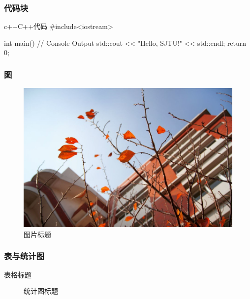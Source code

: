 \documentclass[
]{beamer}
\begin{document}
    \begin{frame}[fragile]          %
        \frametitle{代码块}
        \begin{codeblock}{c++}{C++代码}
#include<iostream>

int main(){
    // Console Output
    std::cout << "Hello, SJTU!" << std::endl;
    return 0;
}
        \end{codeblock}
    \end{frame}

    \begin{frame}
        \frametitle{图}
        \begin{figure}
            \centering
            \begin{stampbox}
                \includegraphics[height=0.3\textheight]{vi/plant.jpg}
            \end{stampbox}
            \caption{图片标题}
        \end{figure}
    \end{frame}

    \begin{frame}
        \frametitle{表与统计图}

        \begin{multicols}{2}
        \begin{table}
            \caption{表格标题}
        \end{table}
        
        \begin{figure}
            
            \caption{统计图标题}
        \end{figure}
        \end{multicols}
    \end{frame}

    \makebottom     %
\end{document}
